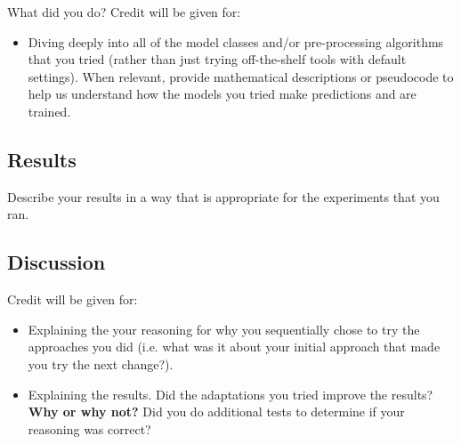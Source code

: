 \documentclass[11pt]{article}
\begin{document}
What did you do? Credit will be given for:
  \begin{itemize}
  \item Diving deeply into all of the model classes and/or pre-processing algorithms that you tried (rather than just trying off-the-shelf tools with default settings).  When relevant, provide mathematical descriptions or pseudocode to help us understand how the models you tried make predictions and are trained. 
  \end{itemize}
  

\subsection{Results}

Describe your results in a way that is appropriate for the experiments that you ran.

\subsection{Discussion}
Credit will be given for:

  \begin{itemize}
  \item Explaining the your reasoning for why you sequentially chose to
    try the approaches you did (i.e. what was it about your initial
    approach that made you try the next change?).  
  \item Explaining the results.  Did the adaptations you tried improve
    the results?  \textbf{Why or why not?}  Did you do additional tests to
    determine if your reasoning was correct?  
  \end{itemize}
 
\end{document}
